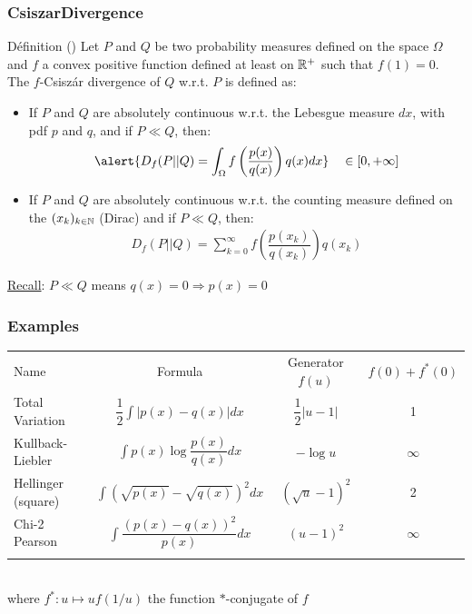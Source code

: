\documentclass[8pt]{beamer}
\begin{document}
\begin{frame}
  \frametitle{CsiszarDivergence}
\small
  \begin{block}{D\'efinition}
(\cite{Csiszar1963})
    Let $P$ and $Q$ be two probability measures defined on the space $\Omega$ and  $f$ a  convex positive function defined at least on ${\mathbb R}^+$ such that $f(1)=0$.\\
    The $f$-Csisz\'ar divergence of $Q$ w.r.t. $P$ is defined as:
    \begin{itemize}
     \item If $P$ and $Q$ are absolutely continuous w.r.t. the Lebesgue measure $dx$, with pdf $p$ and $q$, and if $P  \ll Q$, then: 
    \begin{align}
     \alert{ D_f(P||Q)=\int_{\Omega}f\left(\dfrac{p(x)}{q(x)}\right)q(x)dx} \quad \in[0,+\infty]
    \end{align}
    \item If $P$ and $Q$ are absolutely continuous w.r.t. the counting measure defined on the $(x_k)_{k \in {\mathbb N}}$ (Dirac) and if $P  \ll Q$, then:
    \begin{align}
     \displaystyle D_f(P||Q)=\sum_{k=0}^{\infty}f\left(\dfrac{p(x_k)}{q(x_k)}\right)q(x_k)     
    \end{align}

    \end{itemize}
    
    
    \end{block}
    \underline{Recall}: $P  \ll Q$ means $q(x)= 0 \Longrightarrow p(x)=0$
\end{frame}



\begin{frame}
  \frametitle{Examples}
\centering
      \begin{tabular}{lccc}
        \hline\noalign{\smallskip}
        Name & Formula & Generator $f(u)$ & $f(0)+f^*(0)$ \\
        \noalign{\smallskip}\hline\noalign{\smallskip}
        Total Variation & $\displaystyle\dfrac{1}{2}\int|p(x)-q(x)|dx$ & $\displaystyle\dfrac{1}{2}|u-1|$ & 1 \\
        Kullback-Liebler & $\displaystyle\int p(x)\log\dfrac{p(x)}{q(x)}dx$ & $\displaystyle-\log u$ & $\infty$ \\
        Hellinger (square) & $\displaystyle\int\left(\sqrt{p(x)}-\sqrt{q(x)}\right)^2dx$ & $\displaystyle\left(\sqrt{u}-1\right)^2$ & 2 \\
        Chi-2 Pearson & $\displaystyle\int\dfrac{\left(p(x)-q(x)\right)^2}{p(x)}dx$ & $\displaystyle(u-1)^2$ & $\infty$ \\
        \noalign{\smallskip}\hline \\[0.5em]
      \end{tabular}
 \\
 where $f^*:u\mapsto uf(1/u)$ the function $*$-conjugate of $f$
\end{frame}
\end{document}
